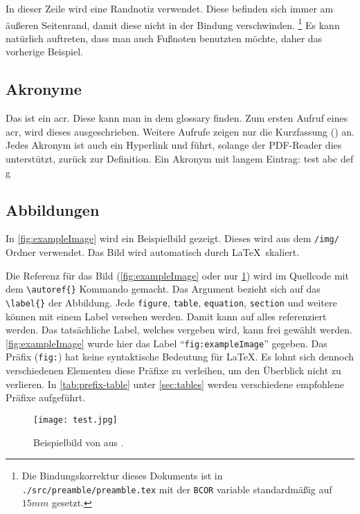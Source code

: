 In dieser Zeile wird eine Randnotiz verwendet.
Diese befinden sich immer am äußeren Seitenrand, damit diese nicht in der Bindung verschwinden.
\footnote{Die Bindungskorrektur dieses Dokuments ist in \texttt{./src/preamble/preamble.tex} mit der \texttt{BCOR} variable standardmäßig auf $15\si{mm}$ gesetzt.}
Es kann natürlich auftreten, dass man auch Fußnoten benutzten möchte, daher das vorherige Beispiel.

\subsection{Akronyme}

Das ist ein \gls{acr}.
Diese kann man in dem \gls{glossary} finden.
Zum ersten Aufruf eines \gls{acr}, wird dieses ausgeschrieben.
Weitere Aufrufe zeigen nur die Kurzfassung () an.
Jedes Akronym ist auch ein Hyperlink und führt, solange der PDF-Reader dies unterstützt, zurück zur Definition.
Ein Akronym mit langem Eintrag: \gls{test} \gls{abc} \gls{def} \gls{g}

\subsection{Abbildungen}

In \autoref{fig:exampleImage} wird ein Beispielbild gezeigt.
Dieses wird aus dem \texttt{/img/} Ordner verwendet.
Das Bild wird automatisch durch \LaTeX\ skaliert.

Die Referenz für das Bild (\autoref{fig:exampleImage} oder nur \ref{fig:exampleImage}) wird im Quellcode mit dem \texttt{\textbackslash autoref\{\}} Kommando gemacht.
Das Argument bezieht sich auf das \texttt{\textbackslash label\{\}} der Abbildung.
Jede \texttt{figure}, \texttt{table}, \texttt{equation}, \texttt{section} und weitere können mit einem Label versehen werden.
Damit kann auf alles referenziert werden.
Das tatsächliche Label, welches vergeben wird, kann frei gewählt werden.
\autoref{fig:exampleImage} wurde hier das Label \enquote{\texttt{fig:exampleImage}} gegeben.
Das Präfix (\texttt{fig:}) hat keine syntaktische Bedeutung für \LaTeX.
Es lohnt sich dennoch verschiedenen Elementen diese Präfixe zu verleihen, um den Überblick nicht zu verlieren.
In \autoref{tab:prefix-table} unter \autoref{sec:tables} werden verschiedene empfohlene Präfixe aufgeführt.

\begin{figure}[ht]
    \centering
    \texttt{[image: test.jpg]}
    \caption[Beispielbild]{Beispielbild von \citeauthor{exampleImage} aus \autocite{exampleImage}.}
    \label{fig:exampleImage}
\end{figure}

